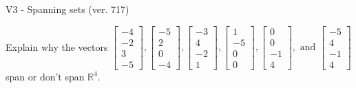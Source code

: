 \begin{exercise}
  \begin{exerciseTitle}V3 - Spanning sets (ver. 717)\end{exerciseTitle}
  \begin{exerciseStatement}
    Explain why the vectors \(\left[\begin{array}{r}
-4 \\
-2 \\
3 \\
-5
\end{array}\right] , \left[\begin{array}{r}
-5 \\
2 \\
0 \\
-4
\end{array}\right] , \left[\begin{array}{r}
-3 \\
4 \\
-2 \\
1
\end{array}\right] , \left[\begin{array}{r}
1 \\
-5 \\
0 \\
0
\end{array}\right] , \left[\begin{array}{r}
0 \\
0 \\
-1 \\
4
\end{array}\right] , \text{ and } \left[\begin{array}{r}
-5 \\
4 \\
-1 \\
4
\end{array}\right]\) span or don't span \(\mathbb{R}^4\). 
	



\end{exerciseStatement}
\end{exercise}
